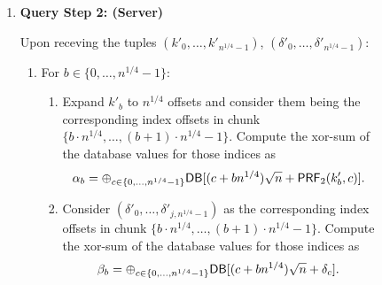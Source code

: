 \begin{figure}[p]
\begin{minipage}{\textwidth}
\begin{mdframed}
\begin{enumerate}[leftmargin=5mm,itemsep=1pt]
\begin{enumerate}[leftmargin=5mm,itemsep=1pt]
                        \item Sample a random sub-key $k'\getr\{0,1\}^\lambda$
                        and denote $\delta'=r\mod \sqrt{n}$.
                        \item Send the following tuples to the server:
                        \begin{align*}
                            (k_{0},\dots,k_{b^*-1}, k',k_{b^*+1},\dots,k_{n^{1/4}-1}) \\
                            (\delta_{0},\dots,\delta_{d^*-1},\delta' ,\delta_{d^*+1},\dots,\delta_{n^{1/4}-1})
                        \end{align*}
                    
                \end{enumerate}
                
                \newpage
                
                \item 
                {\bf Query Step 2: (Server)}
                
                Upon receving the tuples $(k'_0,\dots,k'_{n^{1/4}-1})$,
                $(\delta'_0,\dots,\delta'_{n^{1/4}-1})$: 
                \begin{enumerate}
                    \item For $b\in \{0,\dots,n^{1/4}-1\}$:
                    \begin{enumerate}
                        \item Expand $k'_b$ to $n^{1/4}$ offsets and consider
                        them being the corresponding index offsets in chunk $\{b
                        \cdot n^{1/4}, \ldots, (b + 1)\cdot n^{1/4} -1\}$.
                        Compute the xor-sum of the database values for those
                        indices as 
                        \[
                        \alpha_b=\oplus_{c\in \{0,\dots,n^{1/4}-1\}} \mathsf{DB}[(c + bn^{1/4})\sqrt{n} + \mathsf{PRF}_2(k'_b, c)].
                        \]
                        \item Consider $(\delta'_0,\dots,\delta'_{j,n^{1/4}-1})$
                        as the corresponding index offsets in chunk $\{b \cdot
                        n^{1/4}, \ldots, (b + 1)\cdot n^{1/4} -1\}$. Compute the
                        xor-sum of the database values for those indices as 
                        \[
                        \beta_b=\oplus_{c\in \{0,\dots,n^{1/4}-1\}} \mathsf{DB}[(c + bn^{1/4})\sqrt{n} + \delta_c].
                        \]
                    \end{enumerate}
                    

\end{enumerate}
\end{enumerate}
\end{mdframed}
\end{minipage}
\end{figure}
